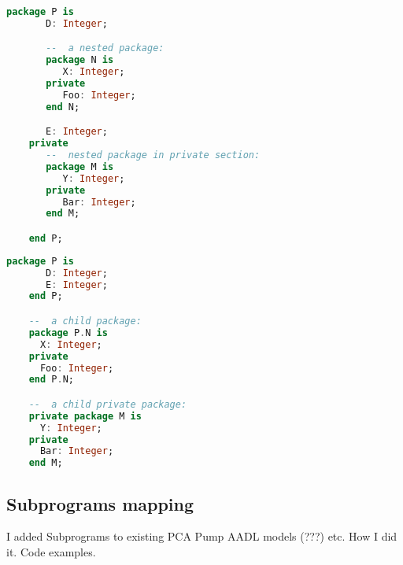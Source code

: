\begin{lstlisting}[language=ada, frame=single, gobble=0, caption={Nested packages in SPARK Ada}, label={listing:nested_packages}]
	package P is
	   D: Integer;

	   --  a nested package:
	   package N is
	      X: Integer;
	   private
	      Foo: Integer;
	   end N;

	   E: Integer;
	private
	   --  nested package in private section:
	   package M is
	      Y: Integer;
	   private
	      Bar: Integer;
	   end M;

	end P;
\end{lstlisting}

\begin{lstlisting}[language=ada, frame=single, gobble=0, caption={Child packages in SPARK Ada}, label={listing:child_packages}]
	package P is
	   D: Integer;
	   E: Integer;
	end P;

	--  a child package:
	package P.N is
      X: Integer;
   	private
      Foo: Integer;
	end P.N;

	--  a child private package:
	private package M is
	  Y: Integer;
	private
	  Bar: Integer;
	end M;
\end{lstlisting}


\subsection{Subprograms mapping}
\label{codegen:mapping:subprograms}

I added Subprograms to existing PCA Pump AADL models (???) etc.
How I did it. Code examples.

